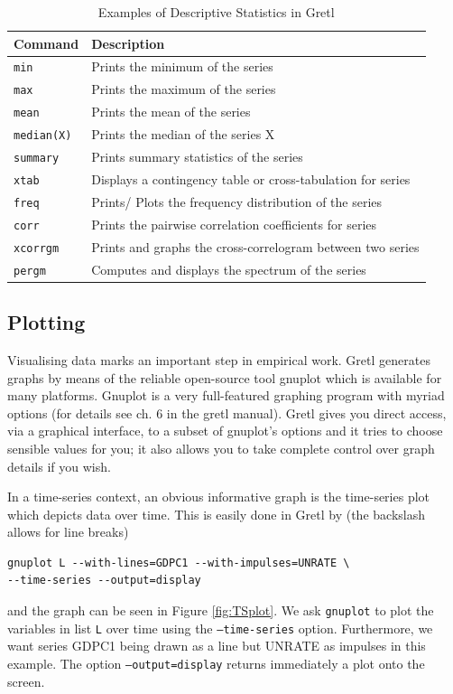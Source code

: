 \documentclass[11pt]{article}
\begin{document}
\begin{table}[!h]
	\centering
	\footnotesize
	\begin{tabular}{ll}
		\hline
		Command & Description \\ 
		\hline 
		\texttt{min} & Prints the minimum of the series \\
		\texttt{max} & Prints the maximum of the series \\
		\texttt{mean} & Prints the mean of the series \\
		\texttt{median(X)} & Prints the median of the series X \\
		\texttt{summary} & Prints summary statistics of the series \\
		\texttt{xtab} & Displays a contingency table or cross-tabulation for series\\ 
		\texttt{freq} & Prints/ Plots the frequency distribution of the series \\
		\texttt{corr} & Prints the pairwise correlation coefficients for series\\
		\texttt{xcorrgm} & Prints and graphs the cross-correlogram between two series \\
		\texttt{pergm} & Computes and displays the spectrum of the series \\
		\hline 
	\end{tabular}
	\caption{Examples of Descriptive Statistics in Gretl}
	\label{tab:descriptive}
\end{table}

\subsection{Plotting}
Visualising data marks an important step in empirical work. Gretl generates graphs by means of the reliable open-source tool gnuplot which is available for many platforms. Gnuplot is a very full-featured graphing program with myriad options (for details see ch. 6 in the gretl manual). Gretl gives you direct access, via a graphical interface, to a subset of gnuplot’s options and it tries to choose sensible values for you; it also allows you to take complete control over graph details if you wish.

In a time-series context, an obvious informative graph is the time-series plot which depicts data over time. This is easily done in Gretl by (the backslash allows for line breaks)
\begin{Verbatim}[baselinestretch=0.75, fontsize=\small]
gnuplot L --with-lines=GDPC1 --with-impulses=UNRATE \
--time-series --output=display
\end{Verbatim}
and the graph can be seen in Figure \ref{fig:TSplot}. We ask \texttt{gnuplot} to plot the variables in list \texttt{L} over time using the \texttt{---time-series} option. Furthermore, we want series GDPC1 being drawn as a line but UNRATE as impulses in this example. The option \texttt{---output=display} returns immediately a plot onto the screen.
\end{document}
